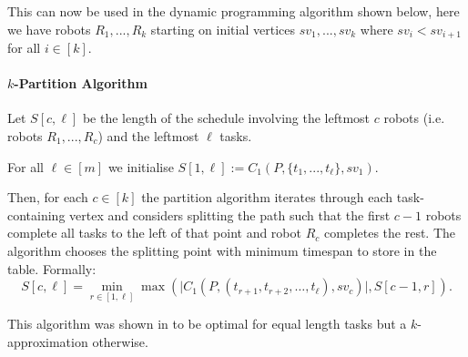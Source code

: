 \documentclass{DAC}
\begin{document}
This can now be used in the dynamic programming algorithm shown below, here we have robots $R_1,...,R_k$ starting on initial vertices $sv_1,...,sv_k$ where $sv_i  < sv_{i+1}$ for all $i\in[k]$. 
\paragraph{$k$-Partition Algorithm}
Let $S[c,\ell ]$ be the length of the schedule involving the leftmost $c$ robots (i.e. robots $R_1,...,R_c$) and the leftmost $\ell$ tasks.

For all $\ell \in [m]$ we initialise $S[1,\ell] := C_1 (P,\{t_1,...,t_\ell \},sv_1 )$.

Then, for each $c \in [k] $ the partition algorithm iterates through each task-containing vertex and considers splitting the path such that the first $c-1$ robots complete all tasks to the left of that point and robot $R_c$ completes the rest. The algorithm chooses the splitting point with minimum timespan to store in the table. Formally:
$$S[c, \ell] = \min_{r \in [1, \ell]} \max(\vert C_1(P, (t_{r + 1}, t_{r + 2}, \dots, t_\ell), sv_c) \vert , S[c-1, r]).$$


This algorithm was shown in \cite{adamson2024collisionfreerobotscheduling} to be optimal for equal length tasks but a $k$-approximation otherwise. 



 
\end{document}
